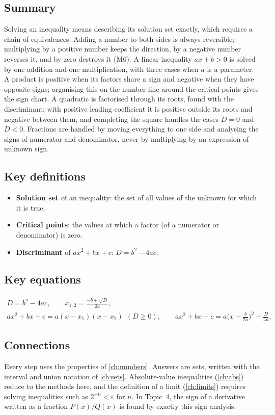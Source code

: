 \subsection*{Summary}
Solving an inequality means describing its solution set exactly, which requires a chain of equivalences.
Adding a number to both sides is always reversible; multiplying by a positive number keeps the direction,
by a negative number reverses it, and by zero destroys it (M6). A linear inequality $ax+b>0$ is solved by one
addition and one multiplication, with three cases when $a$ is a parameter. A product is positive when its
factors share a sign and negative when they have opposite signs; organising this on the number line around the
critical points gives the sign chart. A quadratic is factorised through its roots, found with the discriminant;
with positive leading coefficient it is positive outside its roots and negative between them, and completing the
square handles the cases $D=0$ and $D<0$. Fractions are handled by moving everything to one side and analysing
the signs of numerator and denominator, never by multiplying by an expression of unknown sign.

\subsection*{Key definitions}
\begin{itemize}
  \item \textbf{Solution set} of an inequality: the set of all values of the unknown for which it is true.
  \item \textbf{Critical points}: the values at which a factor (of a numerator or denominator) is zero.
  \item \textbf{Discriminant} of $ax^2+bx+c$: $D=b^2-4ac$.
\end{itemize}

\subsection*{Key equations}
\begin{gather*}
D=b^2-4ac,\qquad x_{1,2}=\frac{-b\pm\sqrt D}{2a},\\
ax^2+bx+c=a(x-x_1)(x-x_2)\ \ (D\ge0),\qquad
ax^2+bx+c=a\Big(x+\frac b{2a}\Big)^2-\frac D{4a}.
\end{gather*}

\subsection*{Connections}
Every step uses the properties of \cref{ch:numbers}. Answers are sets, written with the interval and union
notation of \cref{ch:sets}. Absolute-value inequalities (\cref{ch:abs}) reduce to the methods here, and the
definition of a limit (\cref{ch:limits}) requires solving inequalities such as $2^{-n}<\varepsilon$ for $n$.
In Topic~4, the sign of a derivative written as a fraction $P(x)/Q(x)$ is found by exactly this sign analysis.


